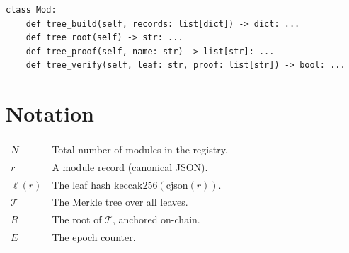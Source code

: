 \documentclass[11pt,a4paper]{article}
\begin{document}
\begin{lstlisting}[style=python]
class Mod:
    def tree_build(self, records: list[dict]) -> dict: ...
    def tree_root(self) -> str: ...
    def tree_proof(self, name: str) -> list[str]: ...
    def tree_verify(self, leaf: str, proof: list[str]) -> bool: ...
\end{lstlisting}

\section{Notation}

\begin{tabularx}{\textwidth}{lX}
\toprule
$N$ & Total number of modules in the registry. \\
$r$ & A module record (canonical JSON). \\
$\ell(r)$ & The leaf hash $\mathrm{keccak256}(\mathrm{cjson}(r))$. \\
$\mathcal{T}$ & The Merkle tree over all leaves. \\
$R$ & The root of $\mathcal{T}$, anchored on-chain. \\
$E$ & The epoch counter. \\
\bottomrule
\end{tabularx}
\end{document}
